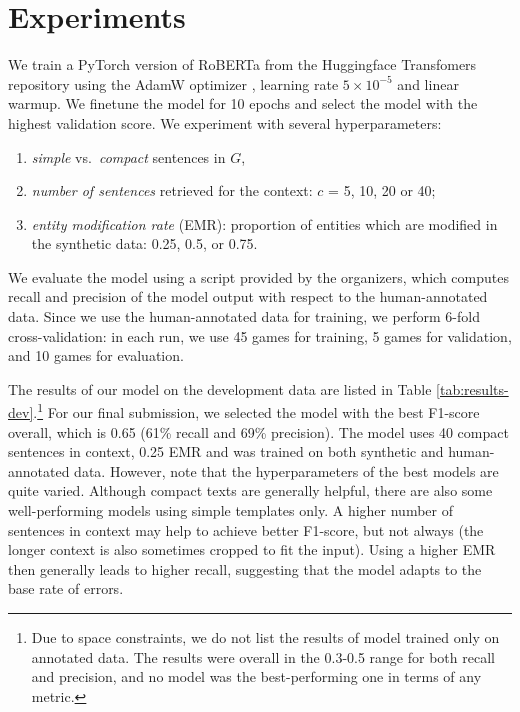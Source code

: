 \section{Experiments}
\label{sec:experiments}

We train a PyTorch version of RoBERTa from the Huggingface Transfomers repository \cite{wolf2019huggingface} using the AdamW optimizer \cite{loshchilov2018fixing}, learning rate $5\times10^{-5}$ and linear warmup.
We finetune the model for 10 epochs and select the model with the highest validation score.
We experiment with several hyperparameters: %
\begin{enumerate}[label={(\alph*)},nosep]
    \item \emph{simple} vs.~\emph{compact} sentences in $G$, %
    \item  \textit{number of sentences} retrieved for the context: $c$ = 5, 10, 20 or 40;
    \item \textit{entity modification rate} (EMR): proportion of entities which are modified in the synthetic data: 0.25, 0.5, or 0.75.
\end{enumerate}

We evaluate the model using a script provided by the organizers, which computes recall and precision of the model output with respect to the human-annotated data. Since we use the human-annotated data for training, we perform 6-fold cross-validation: in each run, we use 45 games for training, 5 games for validation, and 10 games for evaluation.

The results of our model on the development data are listed in Table \ref{tab:results-dev}.\footnote{Due to space constraints, we do not list the results of model trained only on annotated data. The results were overall in the 0.3-0.5 range for both recall and precision, and no model was the best-performing one in terms of any metric.}
For our final submission, we selected the model with the best F1-score overall, which is 0.65 (61\% recall and 69\% precision). The model uses 40 compact sentences in context, 0.25 EMR and was trained on both synthetic and human-annotated data. However, note that the hyperparameters of the best models are quite varied. Although compact texts are generally helpful, there are also some well-performing models using simple templates only. A higher number of sentences in context may help to achieve better F1-score, but not always (the longer context is also sometimes cropped to fit the input). Using a higher EMR then generally leads to higher recall, suggesting that the model adapts to the base rate of errors.

